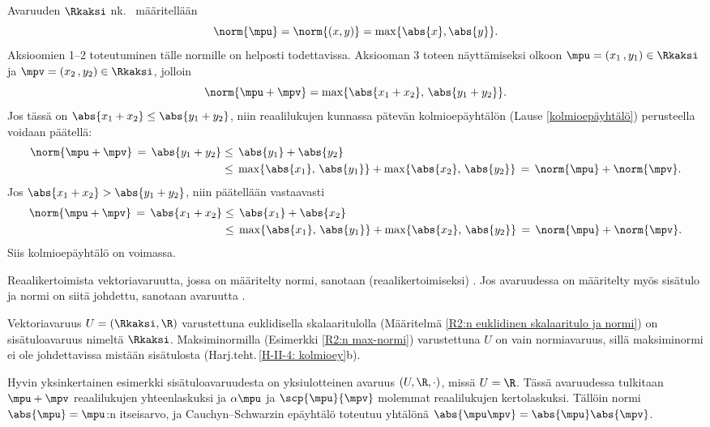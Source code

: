 \begin{Exa} \label{R2:n max-normi} 
Avaruuden $\Rkaksi$ nk.\  määritellään
\[
\norm{\mpu}=\norm{(x,y)}=\max\{\abs{x},\abs{y}\}.
\]
Aksioomien 1--2 toteutuminen tälle normille on helposti todettavissa. Aksiooman 3 toteen
näyttämiseksi olkoon $\mpu=(x_1\,,y_1)\in\Rkaksi$ ja $\mpv=(x_2\,,y_2)\in\Rkaksi$, jolloin
\[
\norm{\mpu+\mpv}=\max\{\abs{x_1+x_2},\,\abs{y_1+y_2}\}.
\]
Jos tässä on $\abs{x_1+x_2}\le\abs{y_1+y_2}$, niin reaalilukujen kunnassa pätevän
kolmioepäyhtälön (Lause \ref{kolmioepäyhtälö}) perusteella voidaan päätellä:
\begin{align*}
\norm{\mpu+\mpv}\,=\,\abs{y_1+y_2} 
                 &\le\,\abs{y_1}+\abs{y_2} \\
                 &\le\,\max\{\abs{x_1},\,\abs{y_1}\}+\max\{\abs{x_2},\,\abs{y_2}\}
                \,=\,\norm{\mpu}+\norm{\mpv}.
\end{align*}
Jos $\abs{x_1+x_2}>\abs{y_1+y_2}$, niin päätellään vastaavasti
\begin{align*}
\norm{\mpu+\mpv}\,=\,\abs{x_1+x_2} 
                 &\le\,\abs{x_1}+\abs{x_2} \\
                 &\le\,\max\{\abs{x_1},\,\abs{y_1}\}+\max\{\abs{x_2},\,\abs{y_2}\}
                \,=\,\norm{\mpu}+\norm{\mpv}.
\end{align*}
Siis kolmioepäyhtälö on voimassa. \loppu
\end{Exa}

Reaalikertoimista vektoriavaruutta, jossa on määritelty normi, sanotaan 
(reaalikertoimiseksi)
. Jos avaruudessa on määritelty myös sisätulo ja normi on siitä johdettu,
sanotaan avaruutta .
\begin{Exa} Vektoriavaruus $U=(\Rkaksi,\R)$ varustettuna euklidisella skalaaritulolla
(Määritelmä \ref{R2:n euklidinen skalaaritulo ja normi}) on sisätuloavaruus nimeltä 
 $\Rkaksi$. Maksiminormilla (Esimerkki \ref{R2:n max-normi}) 
varustettuna $U$ on vain normiavaruus, sillä maksiminormi ei ole johdettavissa mistään
sisätulosta (Harj.teht.\,\ref{H-II-4: kolmioey}b).
\end{Exa}
\begin{Exa} Hyvin yksinkertainen esimerkki sisätuloavaruudesta on yksiulotteinen avaruus 
$(U,\R,\cdot)$, missä $U=\R$. Tässä avaruudessa tulkitaan $\mpu + \mpv$ reaalilukujen 
yhteenlaskuksi ja $\alpha\mpu$ ja $\scp{\mpu}{\mpv}$ molemmat reaalilukujen kertolaskuksi.
Tällöin normi $\abs{\mpu}=\mpu$:n itseisarvo, ja Cauchyn--Schwarzin epäyhtälö toteutuu yhtälönä
$\abs{\mpu\mpv}=\abs{\mpu}\abs{\mpv}$. \loppu 
\end{Exa}

